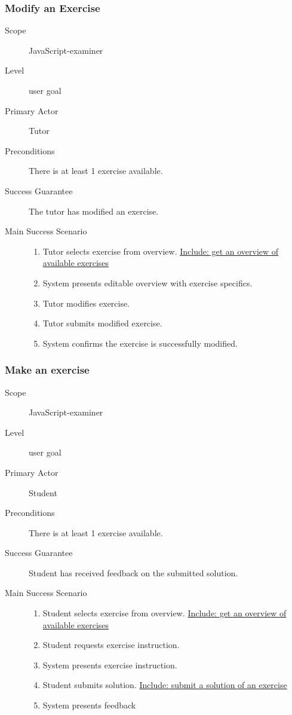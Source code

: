 \subsubsection{Modify an Exercise}
\begin{mdframed} [rightmargin=-100pt]
\begin{description}
  \item[Scope] JavaScript-examiner
  \item[Level] user goal
  \item[Primary Actor] Tutor
  \item[Preconditions] There is at least 1 exercise available.
  \item[Success Guarantee] The tutor has modified an exercise.
  \item[Main Success Scenario] \mbox{}
	\begin{enumerate}
	  \item Tutor selects exercise from overview. \underline{Include: get
        an overview of available exercises}
	  \item System presents editable overview with exercise specifics.
	  \item Tutor modifies exercise.
    \item Tutor submits modified exercise.
    \item System confirms the exercise is successfully modified.
	\end{enumerate}
\end{description}
\end{mdframed}

\subsubsection{Make an exercise}
\begin{mdframed} [rightmargin=-100pt]
\begin{description}
  \item[Scope] JavaScript-examiner
  \item[Level] user goal
  \item[Primary Actor] Student
  \item[Preconditions] There is at least 1 exercise available.
  \item[Success Guarantee] Student has received feedback on the submitted 
	solution.
  \item[Main Success Scenario] \mbox{}
	\begin{enumerate}
	  \item Student selects exercise from overview. \underline{Include: get
        an overview of available exercises}
	  \item Student requests exercise instruction.
	  \item System presents exercise instruction.
	  \item Student submits solution. \underline{Include: submit a solution of 
	    an exercise}
	  \item System presents feedback
	\end{enumerate}
\end{description}
\end{mdframed}

